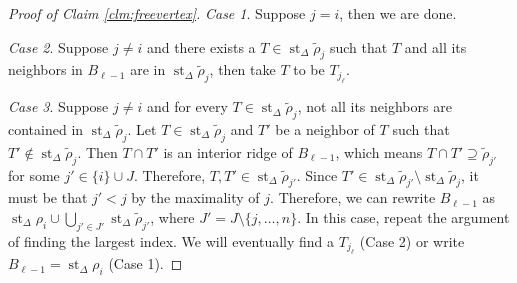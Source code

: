\documentclass[11pt,twoside]{article}
\theoremstyle{definition}
\DeclareMathOperator{\st}{st}
\begin{document}
\begin{proof}[Proof of Claim \ref{clm:freevertex}]
    \emph{Case 1}. Suppose $j = i$, then we are done. 
    
    \emph{Case 2}. Suppose $j \ne i$ and there exists a $T \in \st_\Delta \tilde{\rho}_j$ such that $T$ and all its neighbors in $B_{\ell - 1}$ are in $\st_\Delta \tilde{\rho}_j$, then take $T$ to be $T_{j_\ell}$. 
    
    \emph{Case 3}. Suppose $j \ne i$ and for every $T \in \st_\Delta \tilde{\rho}_j$, not all its neighbors are contained in $\st_\Delta \tilde{\rho}_j$. Let $T \in \st_\Delta \tilde{\rho}_j$ and $T'$ be a neighbor of $T$ such that $T' \notin \st_\Delta \tilde{\rho}_j$. Then $T \cap T'$ is an interior ridge of $B_{\ell - 1}$, which means $T \cap T' \supseteq \tilde{\rho}_{j'}$ for some $j' \in \{i\} \cup J$. Therefore, $T, T' \in \st_\Delta \tilde{\rho}_{j'}$. Since $T' \in \st_\Delta \tilde{\rho}_{j'} \setminus \st_\Delta \tilde{\rho}_j$, it must be that $j' < j$ by the maximality of $j$. Therefore, we can rewrite $B_{\ell - 1}$ as $\st_\Delta \rho_i \cup \bigcup_{j' \in J'} \st_\Delta \tilde{\rho}_{j'}$, where $J' = J \setminus \{j, \dots, n\}$. In this case, repeat the argument of finding the largest index. We will eventually find a $T_{j_\ell}$ (Case 2) or write $B_{\ell - 1} = \st_\Delta \rho_i$ (Case 1). 
    \end{proof}
\end{document}
